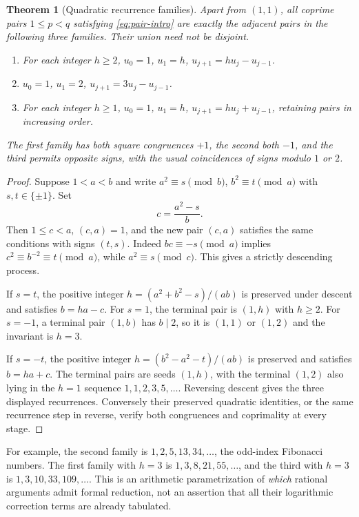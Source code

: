 \documentclass[11pt]{article}
\numberwithin{equation}{section}
\newtheorem{theorem}{Theorem}[section]
\theoremstyle{definition}
\theoremstyle{remark}
\begin{document}
\begin{theorem}[Quadratic recurrence families]\label{thm:recurrences}
Apart from $(1,1)$, all coprime pairs $1\le p<q$ satisfying
\eqref{eq:pair-intro} are exactly the adjacent pairs in the following
three families. Their union need not be disjoint.
\begin{enumerate}
\item For each integer $h\ge2$,
      $u_0=1$, $u_1=h$, $u_{j+1}=h u_j-u_{j-1}$.
\item $u_0=1$, $u_1=2$, $u_{j+1}=3u_j-u_{j-1}$.
\item For each integer $h\ge1$,
      $u_0=1$, $u_1=h$, $u_{j+1}=h u_j+u_{j-1}$,
      retaining pairs in increasing order.
\end{enumerate}
The first family has both square congruences $+1$, the second both
$-1$, and the third permits opposite signs, with the usual coincidences
of signs modulo $1$ or $2$.
\end{theorem}
\begin{proof}
Suppose $1<a<b$ and write
$a^2\equiv s\pmod b$, $b^2\equiv t\pmod a$ with $s,t\in\{\pm1\}$.
Set
\[
 c=\frac{a^2-s}{b}.
\]
Then $1\le c<a$, $(c,a)=1$, and the new pair $(c,a)$ satisfies the same
conditions with signs $(t,s)$. Indeed $bc\equiv-s\pmod a$ implies
$c^2\equiv b^{-2}\equiv t\pmod a$, while $a^2\equiv s\pmod c$.
This gives a strictly descending process.

If $s=t$, the positive integer
$h=(a^2+b^2-s)/(ab)$ is preserved under descent and satisfies
$b=h a-c$. For $s=1$, the terminal pair is $(1,h)$ with $h\ge2$.
For $s=-1$, a terminal pair $(1,b)$ has $b\mid2$, so it is $(1,1)$
or $(1,2)$ and the invariant is $h=3$.

If $s=-t$, the positive integer
$h=(b^2-a^2-t)/(ab)$ is preserved and satisfies $b=h a+c$.
The terminal pairs are seeds $(1,h)$, with the terminal $(1,2)$ also
lying in the $h=1$ sequence $1,1,2,3,5,\ldots$. Reversing descent gives
the three displayed recurrences. Conversely their preserved quadratic
identities, or the same recurrence step in reverse, verify both
congruences and coprimality at every stage.
\end{proof}

For example, the second family is $1,2,5,13,34,\ldots$, the odd-index
Fibonacci numbers. The first family with $h=3$ is
$1,3,8,21,55,\ldots$, and the third with $h=3$ is
$1,3,10,33,109,\ldots$. This is an arithmetic parametrization of
\emph{which} rational arguments admit formal reduction, not an assertion
that all their logarithmic correction terms are already tabulated.
\end{document}
